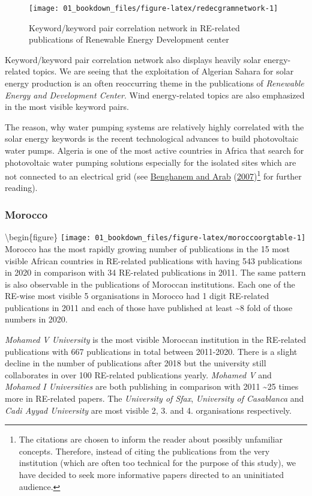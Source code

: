\documentclass[
]{book}
\begin{document}
\begin{figure}
\texttt{[image: 01\_bookdown\_files/figure-latex/redecgramnetwork-1]} \caption{Keyword/keyword pair correlation network in RE-related publications of Renewable Energy Development center}\label{fig:redecgramnetwork}
\end{figure}

Keyword/keyword pair correlation network also displays heavily solar energy-related topics. We are seeing that the exploitation of Algerian Sahara for solar energy production is an often reoccurring theme in the publications of \emph{Renewable Energy and Development Center}. Wind energy-related topics are also emphasized in the most visible keyword pairs.

The reason, why water pumping systems are relatively highly correlated with the solar energy keywords is the recent technological advances to build photovoltaic water pumps. Algeria is one of the most active countries in Africa that search for photovoltaic water pumping solutions especially for the isolated sites which are not connected to an electrical grid (see \protect\hyperlink{ref-benghanem2007}{Benghanem and Arab} (\protect\hyperlink{ref-benghanem2007}{2007})\footnote{The citations are chosen to inform the reader about possibly unfamiliar concepts. Therefore, instead of citing the publications from the very institution (which are often too technical for the purpose of this study), we have decided to seek more informative papers directed to an uninitiated audience.} for further reading).

\hypertarget{morocco}{%
\subsubsection{Morocco}\label{morocco}}

\textbackslash begin\{figure\}
\texttt{[image: 01\_bookdown\_files/figure-latex/moroccoorgtable-1]}
Morocco has the most rapidly growing number of publications in the 15 most visible African countries in RE-related publications with having 543 publications in 2020 in comparison with 34 RE-related publications in 2011. The same pattern is also observable in the publications of Moroccan institutions. Each one of the RE-wise most visible 5 organisations in Morocco had 1 digit RE-related publications in 2011 and each of those have published at least \textasciitilde8 fold of those numbers in 2020.

\emph{Mohamed V University} is the most visible Moroccan institution in the RE-related publications with 667 publications in total between 2011-2020. There is a slight decline in the number of publications after 2018 but the university still collaborates in over 100 RE-related publications yearly. \emph{Mohamed V} and \emph{Mohamed I Universities} are both publishing in comparison with 2011 \textasciitilde25 times more in RE-related papers. The \emph{University of Sfax}, \emph{University of Casablanca} and \emph{Cadi Ayyad University} are most visible 2, 3. and 4. organisations respectively.
\end{document}
